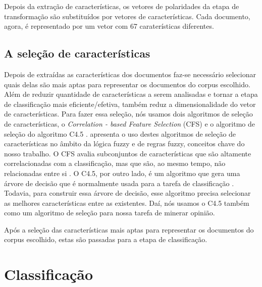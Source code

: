 Depois da extração de características, os vetores de polaridades da etapa de transformação são substituídos por vetores de características. Cada documento, agora, é representado por um vetor com 67 caraterísticas diferentes. 

\subsection{A seleção de características}

Depois de extraídas as características dos documentos faz-se necessário selecionar quais delas são mais aptas para representar os documentos do corpus escolhido. Além de reduzir quantidade de características a serem analisadas e tornar a etapa de classificação mais eficiente/efetiva, também reduz a dimensionalidade do vetor de características. Para fazer essa seleção, nós usamos dois algoritmos de seleção de características, o \textit{Correlation - based Feature Selection} (CFS) e o algoritmo de seleção do algoritmo C4.5 \cite{cintra2008fuzzy}.  apresenta o uso destes algoritmos de seleção de características no âmbito da lógica fuzzy e de regras fuzzy, conceitos chave do nosso trabalho. O CFS avalia subconjuntos de características que são altamente correlacionadas com a classificação, mas que são, ao mesmo tempo, não relacionadas entre si \cite{hall1999correlation}. O C4.5, por outro lado, é um algoritmo que gera uma árvore de decisão que é normalmente usada para a tarefa de classificação \cite{quinlan19934}. Todavia, para construir essa árvore de decisão, esse algoritmo precisa selecionar as melhores características entre as existentes. Daí, nós usamos o C4.5 também como um algoritmo de seleção para nossa tarefa de minerar opinião.

Após a seleção das características mais aptas para representar os documentos do corpus escolhido, estas são passadas para a etapa de classificação. 

\section{Classificação}


